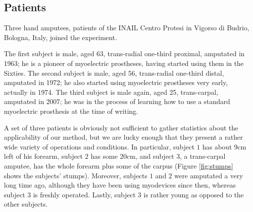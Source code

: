 \subsection{Patients}

Three hand amputees, patients of the INAIL Centro Protesi in Vigorso
di Budrio, Bologna, Italy, joined the experiment.

The first subject is male, aged 63, trans-radial one-third proximal,
amputated in 1963; he is a pioneer of myoelectric prostheses, having
started using them in the Sixties. The second subject is male, aged
56, trans-radial one-third distal, amputated in 1972; he also started
using myoelectric prostheses very early, actually in 1974. The third
subject is male again, aged 25, trans-carpal, amputated in 2007; he
was in the process of learning how to use a standard myoelectric
prosthesis at the time of writing.

A set of three patients is obviously not sufficient to gather
statistics about the applicability of our method, but we are lucky
enough that they present a rather wide variety of operations and
conditions. In particular, subject $1$ has about $9$cm left of his
forearm, subject $2$ has some $20$cm, and subject $3$, a trans-carpal
amputee, has the whole forearm plus some of the carpus (Figure
\ref{fig:stumps} shows the subjects' stumps). Moreover, subjects $1$
and $2$ were amputated a very long time ago, although they have been
using myodevices since then, whereas subject $3$ is freshly
operated. Lastly, subject $3$ is rather young as opposed to the other
subjects.

